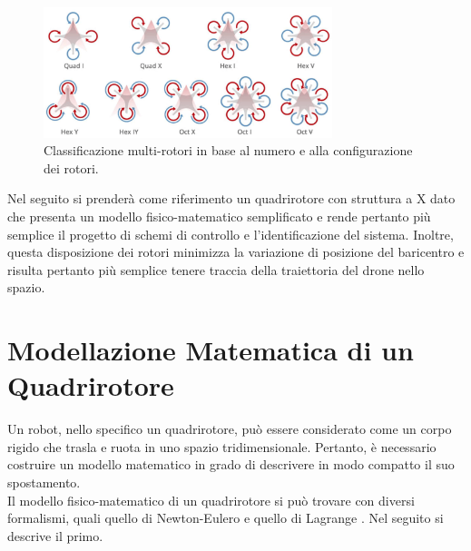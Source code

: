 \begin{figure}[H]
    \centering
    \includegraphics[width=0.75\textwidth]{gfx/drone_types}
    \caption[Classificazione multi-rotori.]{Classificazione multi-rotori in base al numero e alla configurazione dei rotori.}
    \label{fig:droneTypes}
\end{figure}

Nel seguito si prenderà come riferimento un quadrirotore con struttura a X dato che presenta un modello fisico-matematico semplificato e rende pertanto più semplice il progetto di schemi di controllo e l'identificazione del sistema. Inoltre, questa disposizione dei rotori minimizza la variazione di posizione del baricentro e risulta pertanto più semplice tenere traccia della traiettoria del drone nello spazio.


\section{Modellazione Matematica di un Quadrirotore}
Un robot, nello specifico un quadrirotore, può essere considerato come un corpo rigido che trasla e ruota in uno spazio tridimensionale. Pertanto, è necessario costruire un modello matematico in grado di descrivere in modo compatto il suo spostamento.\\

Il modello fisico-matematico di un quadrirotore si può trovare con diversi formalismi, quali quello di Newton-Eulero e quello di Lagrange \cite{modelloQuad1} \cite{modelloQuad2} \cite{modelloQuad3}. Nel seguito si descrive il primo.\\

